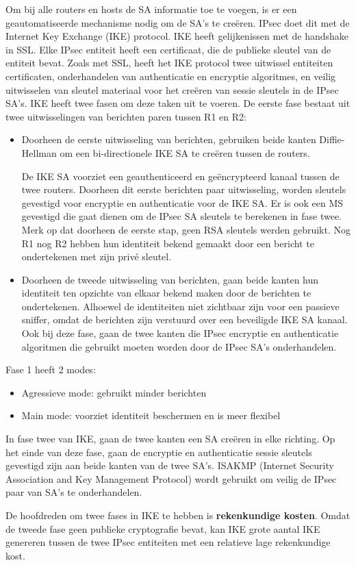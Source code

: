 \noindent Om bij alle routers en hosts de SA informatie toe te voegen, is er een geautomatiseerde mechanisme nodig om de SA’s te creëren. IPsec doet dit met de Internet Key Exchange (IKE) protocol. IKE heeft gelijkenissen met de handshake in SSL. Elke IPsec entiteit heeft een certificaat, die de publieke sleutel van de entiteit bevat. Zoals met SSL, heeft het IKE protocol twee uitwissel entiteiten certificaten, onderhandelen van authenticatie en encryptie algoritmes, en veilig uitwisselen van sleutel materiaal voor het creëren van sessie sleutels in de IPsec SA’s.
IKE heeft twee fasen om deze taken uit te voeren. De eerste fase bestaat uit twee uitwisselingen van berichten paren tussen R1 en R2:
\begin{itemize}
\item Doorheen de eerste uitwisseling van berichten, gebruiken beide kanten Diffie-Hellman om een bi-directionele IKE SA te creëren tussen de routers. 

De IKE SA voorziet een geauthenticeerd en geëncrypteerd kanaal tussen de twee routers. 
Doorheen dit eerste berichten paar uitwisseling, worden sleutels gevestigd voor encryptie en authenticatie voor de IKE SA. Er is ook een MS gevestigd die gaat dienen om de IPsec SA sleutels te berekenen in fase twee.
Merk op dat doorheen de eerste stap, geen RSA sleutels werden gebruikt. Nog R1 nog R2 hebben hun identiteit bekend gemaakt door een bericht te ondertekenen met zijn privé sleutel.
\item Doorheen de tweede uitwisseling van berichten, gaan beide kanten hun identiteit ten opzichte van elkaar bekend maken door de berichten te ondertekenen. Alhoewel de identiteiten niet zichtbaar zijn voor een passieve sniffer, omdat de berichten zijn verstuurd over een beveiligde IKE SA kanaal. Ook bij deze fase, gaan de twee kanten die IPsec encryptie en authenticatie algoritmen die gebruikt moeten worden door de IPsec SA’s onderhandelen.
\end{itemize}

\noindent Fase 1 heeft 2 modes:
\begin{itemize}
\item Agressieve mode: gebruikt minder berichten
\item Main mode: voorziet identiteit beschermen en is meer flexibel
\end{itemize}

\noindent In fase twee van IKE, gaan de twee kanten een SA creëren in elke richting. Op het einde van deze fase, gaan de encryptie en authenticatie sessie sleutels gevestigd zijn aan beide kanten van de twee SA’s. ISAKMP (Internet Security Association and Key Management Protocol) wordt gebruikt om veilig de IPsec paar van SA’s te onderhandelen.

\noindent De hoofdreden om twee fases in IKE te hebben is \textbf{rekenkundige kosten}. Omdat de tweede fase geen publieke cryptografie bevat, kan IKE grote aantal IKE genereren tussen de twee IPsec entiteiten met een relatieve lage rekenkundige kost.
